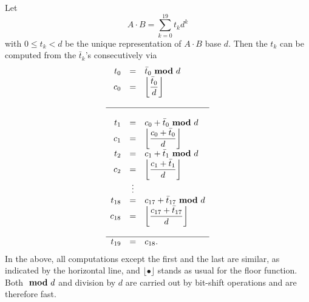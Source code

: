 \documentclass{article}
\renewcommand{\mod}{{~\bf mod~}}
\begin{document}
Let
\[
A\cdot B = \sum_{k=0}^{19} t_k d^k
\] 
with $0\leq t_k < d$ be the unique representation of $A\cdot B$ base $d$. Then the $t_k$ can be computed from the $\bar t_k$'s consecutively via 
\[
\begin{array}{rcl}
\displaystyle t_0 &= &\displaystyle \bar t_0 \mod d\\
\displaystyle c_0 &= &\displaystyle \left\lfloor \frac{\bar t_0}{d} \right\rfloor\\ \\\hline \\
\displaystyle t_1 &= &\displaystyle c_0 + \bar t_0 \mod d\\
\displaystyle c_1 &= &\displaystyle \left\lfloor \frac{c_0 + \bar t_0}{d} \right\rfloor \\
\displaystyle t_2 &= &\displaystyle c_1 + \bar t_1 \mod d\\
\displaystyle c_2 &= &\displaystyle \left\lfloor \frac{c_1 + \bar t_1}{d} \right\rfloor \\
&\vdots&\\
\displaystyle t_{18} &= &\displaystyle c_{17} + \bar t_{17} \mod d\\
\displaystyle c_{18} &= &\displaystyle \left\lfloor \frac{c_{17} + \bar t_{17}}{d} \right\rfloor \\ \\ \hline
\displaystyle t_{19} &= &\displaystyle  c_{18}.
\end{array}
\]
In the above, all computations except the first and the last are similar, as indicated by the horizontal line, and $\lfloor\bullet \rfloor$ stands as usual for the floor function. Both $\mod d$ and division by $d$ are carried out by bit-shift operations and are therefore fast.
\end{document}
